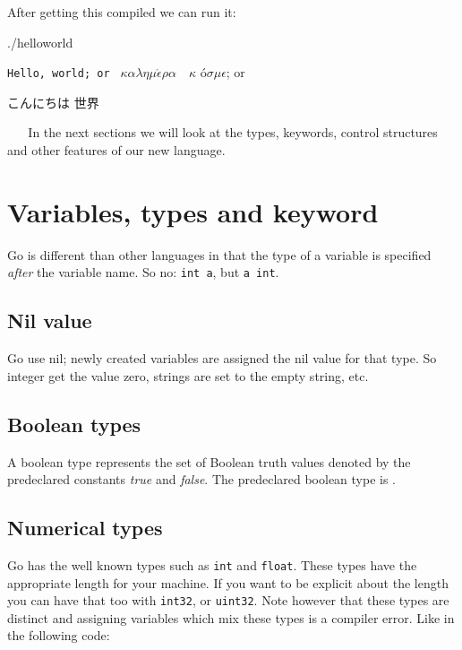 After getting this compiled we can run it:
\begin{display}
\pr ./helloworld
\end{display}\texttt{Hello, world; or }%
\begin{math}\kappa\alpha\lambda\eta\mu\acute{\epsilon}\rho\alpha\hspace{1em}\kappa\end{math}%
\'o\begin{math} \sigma\mu\epsilon\end{math}; or \begin{cjk}こんにちは 世界\end{cjk}
\ \newline
\ \newline
In the next sections we will look at the types, keywords, control structures
and other features of our new language. 

\section{Variables, types and keyword}
Go is different than other languages in that the type of a variable
is specified \emph{after} the variable name. So no: 
\lstinline{int a}, but \lstinline{a int}.

\subsection{Nil value}
Go use nil;
newly created variables are assigned the nil value for that type. So
integer get the value zero, strings are set to the empty string, etc.

\subsection{Boolean types}
A boolean type represents the set of Boolean truth values denoted by the
predeclared constants \emph{true} and \emph{false}. The predeclared boolean type is .

\subsection{Numerical types}

Go has the well known types such as \lstinline{int} and
\lstinline{float}. These types have the appropriate length for your
machine. If you want to be explicit about the length you can have
that too with \lstinline{int32}, or \lstinline{uint32}. Note however
that these types are distinct and assigning variables which mix
these types is a compiler error. Like in the following code:

